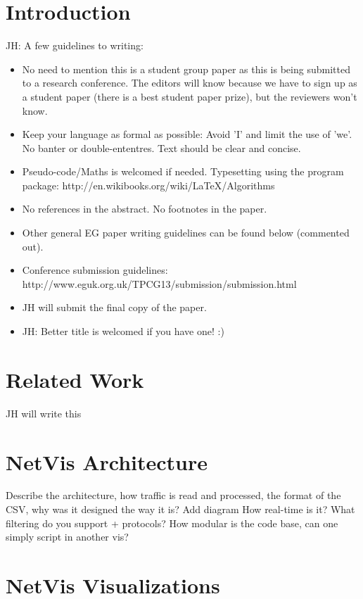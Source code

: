 \section{Introduction}
{\color{red}JH: A few guidelines to writing:
\begin{itemize}
  \item No need to mention this is a student group paper as this is being submitted to a research conference. The editors will know because we have to sign up as a student paper (there is a best student paper prize), but the reviewers won't know.
  \item Keep your language as formal as possible: Avoid 'I' and limit the use of 'we'. No banter or double-ententres. Text should be clear and concise.
  \item Pseudo-code/Maths is welcomed if needed. Typesetting using the program package: http://en.wikibooks.org/wiki/LaTeX/Algorithms
  \item No references in the abstract. No footnotes in the paper.
  \item Other general EG paper writing guidelines can be found below (commented out).
  \item Conference submission guidelines: http://www.eguk.org.uk/TPCG13/submission/submission.html
  \item JH will submit the final copy of the paper.
  \item JH: Better title is welcomed if you have one! :)
\end{itemize}
}

\section{Related Work}
{\color{red}JH will write this}

\section{NetVis Architecture}
{\color{red} Describe the architecture, how traffic is read and processed, the format of the CSV, why was it designed the way it is? Add diagram}
{\color{red} How real-time is it? What filtering do you support + protocols?}
{\color{red} How modular is the code base, can one simply script in another vis?}

\section{NetVis Visualizations}

